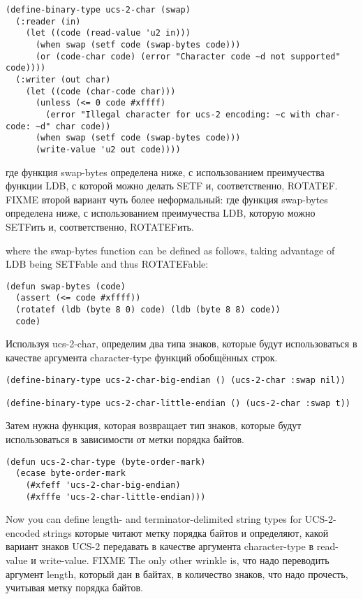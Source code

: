 \begin{lstlisting}
(define-binary-type ucs-2-char (swap)
  (:reader (in)
    (let ((code (read-value 'u2 in)))
      (when swap (setf code (swap-bytes code)))
      (or (code-char code) (error "Character code ~d not supported" code))))
  (:writer (out char)
    (let ((code (char-code char)))
      (unless (<= 0 code #xffff)
        (error "Illegal character for ucs-2 encoding: ~c with char-code: ~d" char code))
      (when swap (setf code (swap-bytes code)))
      (write-value 'u2 out code))))
\end{lstlisting}

где функция swap-bytes определена ниже, с использованием преимучества функции LDB, с
которой можно делать SETF и, соответственно, ROTATEF.  FIXME второй вариант чуть более
неформальный: где функция swap-bytes определена ниже, с использованием преимучества LDB,
которую можно SETFить и, соответственно, ROTATEFить.

where the swap-bytes function can be defined as follows, taking advantage of LDB being
SETFable and thus ROTATEFable:

\begin{lstlisting}
(defun swap-bytes (code)
  (assert (<= code #xffff))
  (rotatef (ldb (byte 8 0) code) (ldb (byte 8 8) code))
  code)
\end{lstlisting}

Используя ucs-2-char, определим два типа знаков, которые будут использоваться в качестве
аргумента character-type функций обобщённых строк.

\begin{lstlisting}
(define-binary-type ucs-2-char-big-endian () (ucs-2-char :swap nil))

(define-binary-type ucs-2-char-little-endian () (ucs-2-char :swap t))
\end{lstlisting}

Затем нужна функция, которая возвращает тип знаков, которые будут использоваться в
зависимости от метки порядка байтов.

\begin{lstlisting}
(defun ucs-2-char-type (byte-order-mark)
  (ecase byte-order-mark
    (#xfeff 'ucs-2-char-big-endian)
    (#xfffe 'ucs-2-char-little-endian)))
\end{lstlisting}

Now you can define length- and terminator-delimited string types for UCS-2-encoded strings
которые читают метку порядка байтов и определяют, какой вариант знаков UCS-2 передавать в
качестве аргумента character-type в read-value и write-value.  FIXME The only other
wrinkle is, что надо переводить аргумент length, который дан в байтах, в количество
знаков, что надо прочесть, учитывая метку порядка байтов.

